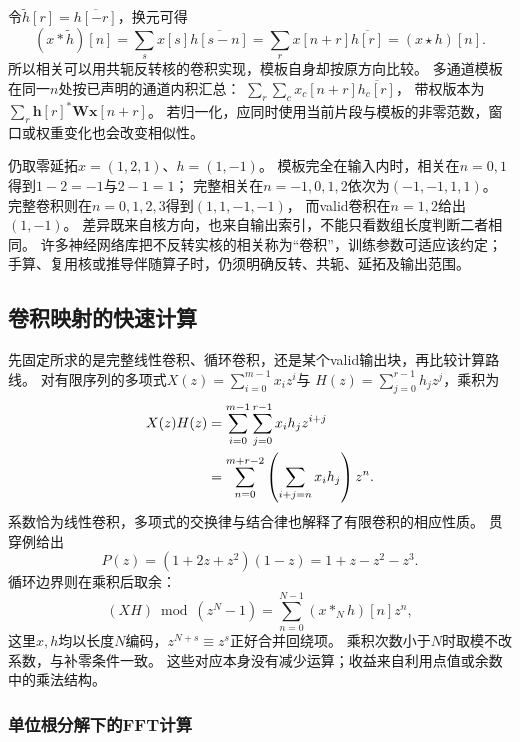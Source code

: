 令$\widetilde h[r]=\overline{h[-r]}$，换元可得
\[
  (x*\widetilde h)[n]=\sum_s x[s]\overline{h[s-n]}
  =\sum_r x[n+r]\overline{h[r]}=(x\star h)[n].
\]
所以相关可以用共轭反转核的卷积实现，模板自身却按原方向比较。
多通道模板在同一$n$处按已声明的通道内积汇总：
$\sum_r\sum_c x_c[n+r]\overline{h_c[r]}$，
带权版本为$\sum_r\bm h[r]^*\bm W\bm x[n+r]$。
若归一化，应同时使用当前片段与模板的非零范数，窗口或权重变化也会改变相似性。

仍取零延拓$x=(1,2,1)$、$h=(1,-1)$。
模板完全在输入内时，相关在$n=0,1$得到$1-2=-1$与$2-1=1$；
完整相关在$n=-1,0,1,2$依次为$(-1,-1,1,1)$。
完整卷积则在$n=0,1,2,3$得到$(1,1,-1,-1)$，
而valid卷积在$n=1,2$给出$(1,-1)$。
差异既来自核方向，也来自输出索引，不能只看数组长度判断二者相同。
许多神经网络库把不反转实核的相关称为“卷积”，训练参数可适应该约定；
手算、复用核或推导伴随算子时，仍须明确反转、共轭、延拓及输出范围。

\subsection{卷积映射的快速计算}
\label{sec:signal-analysis-fast-transforms}

先固定所求的是完整线性卷积、循环卷积，还是某个valid输出块，再比较计算路线。
对有限序列的多项式$X(z)=\sum_{i=0}^{m-1}x_i z^i$与
$H(z)=\sum_{j=0}^{r-1}h_jz^j$，乘积为
\begin{align}
  X(z)H(z)
  &=\sum_{i=0}^{m-1}\sum_{j=0}^{r-1}x_i h_jz^{i+j}\notag\\
  &=\sum_{n=0}^{m+r-2}\left(\sum_{i+j=n}x_i h_j\right)z^n.
  \label{eq:signal-analysis-polynomial-convolution}
\end{align}
系数恰为线性卷积，多项式的交换律与结合律也解释了有限卷积的相应性质。
贯穿例给出
\begin{equation}
  P(z)=(1+2z+z^2)(1-z)=1+z-z^2-z^3.
  \label{eq:signal-analysis-running-polynomial-product}
\end{equation}
循环边界则在乘积后取余：
\begin{equation}
  (XH)\bmod(z^N-1)=\sum_{n=0}^{N-1}(x*_Nh)[n]z^n,
  \label{eq:signal-analysis-polynomial-circular-convolution}
\end{equation}
这里$x,h$均以长度$N$编码，$z^{N+s}\equiv z^s$正好合并回绕项。
乘积次数小于$N$时取模不改系数，与补零条件一致。
这些对应本身没有减少运算；收益来自利用点值或余数中的乘法结构。

\subsubsection{单位根分解下的FFT计算}

